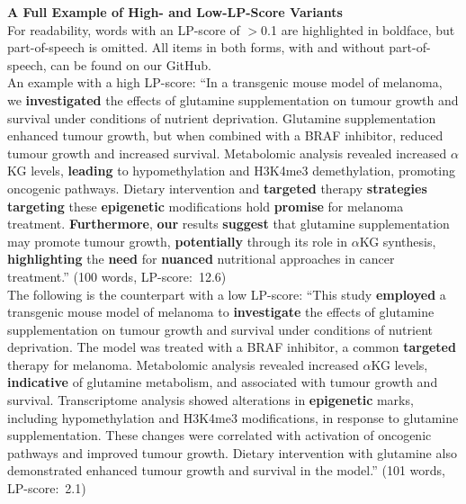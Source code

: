 \textbf{A Full Example of High- and Low-LP-Score Variants} \\

For readability, words with an LP-score of $>$0.1 are highlighted in boldface, but part-of-speech is omitted. All items in both forms, with and without part-of-speech, can be found on our GitHub. \\

\noindent An example with a high LP-score: ``In a transgenic mouse model of melanoma, we \textbf{investigated} the effects of glutamine supplementation on tumour growth and survival under conditions of nutrient deprivation. Glutamine supplementation enhanced tumour growth, but when combined with a BRAF inhibitor, reduced tumour growth and increased survival. Metabolomic analysis revealed increased $\alpha$KG levels, \textbf{leading} to hypomethylation and H3K4me3 demethylation, promoting oncogenic pathways. Dietary intervention and \textbf{targeted} therapy \textbf{strategies} \textbf{targeting} these \textbf{epigenetic} modifications hold \textbf{promise} for melanoma treatment. \textbf{Furthermore}, \textbf{our} results \textbf{suggest} that glutamine supplementation may promote tumour growth, \textbf{potentially} through its role in $\alpha$KG synthesis, \textbf{highlighting} the \textbf{need} for \textbf{nuanced} nutritional approaches in cancer treatment.'' (100 words, LP-score:\ 12.6) \\

\noindent The following is the counterpart with a low LP-score: ``This study \textbf{employed} a transgenic mouse model of melanoma to \textbf{investigate} the effects of glutamine supplementation on tumour growth and survival under conditions of nutrient deprivation. The model was treated with a BRAF inhibitor, a common \textbf{targeted} therapy for melanoma. Metabolomic analysis revealed increased $\alpha$KG levels, \textbf{indicative} of glutamine metabolism, and associated with tumour growth and survival. Transcriptome analysis showed alterations in \textbf{epigenetic} marks, including hypomethylation and H3K4me3 modifications, in response to glutamine supplementation. These changes were correlated with activation of oncogenic pathways and improved tumour growth. Dietary intervention with glutamine also demonstrated enhanced tumour growth and survival in the model.'' (101 words, LP-score:\ 2.1) \\

